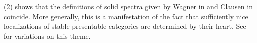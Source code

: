 \begin{remark}\label{rmk: definitions of solid spectra agree}
     (2) shows that the definitions of solid spectra given by Wagner in \cite[\S B.6]{WagnerHHab} and Clausen in \cite[Def. 13.2]{ClausenLie} coincide. More generally, this is a manifestation of the fact that sufficiently nice localizations of stable presentable categories are determined by their heart. See  for variations on this theme. 
\end{remark}